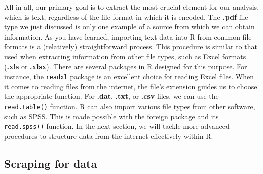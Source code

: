 All in all, our primary goal is to extract the most crucial element for
our analysis, which is text, regardless of the file format in which it is encoded. The \textbf{.pdf} file type we just discussed is only one example of a
source from which we can obtain information. As you have learned,
importing text data into R from common file formats is a (relatively)
straightforward process. This procedure is similar to that used when
extracting information from other file types, such as Excel formats
(\textbf{.xls} or \textbf{.xlsx}). There are several packages in R
designed for this purpose. For instance, the \texttt{readxl} package is
an excellent choice for reading Excel files. When it comes to reading
files from the internet, the file's extension guides us to choose the
appropriate function. For \textbf{.dat}, \textbf{.txt}, or \textbf{.csv}
files, we can use the \texttt{read.table()} function. R can also import various file types from other software, such as
SPSS. This is made possible with the foreign package and its
\texttt{read.spss()} function. In the next section, we will
tackle more advanced procedures to structure data from the internet
effectively within R.

\subsection{Scraping for data}\label{scraping-for-data}

